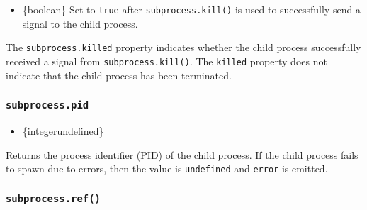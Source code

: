 \begin{itemize}
\tightlist
\item
  \{boolean\} Set to \texttt{true} after \texttt{subprocess.kill()} is
  used to successfully send a signal to the child process.
\end{itemize}

The \texttt{subprocess.killed} property indicates whether the child
process successfully received a signal from \texttt{subprocess.kill()}.
The \texttt{killed} property does not indicate that the child process
has been terminated.

\subsubsection{\texorpdfstring{\texttt{subprocess.pid}}{subprocess.pid}}\label{subprocess.pid}

\begin{itemize}
\tightlist
\item
  \{integer\textbar undefined\}
\end{itemize}

Returns the process identifier (PID) of the child process. If the child
process fails to spawn due to errors, then the value is
\texttt{undefined} and \texttt{error} is emitted.

\begin{Shaded}
\begin{Highlighting}[]
\OperatorTok{=} \NormalTok{(}\NormalTok{)}\OperatorTok{;}
\OperatorTok{=} \NormalTok{(}\OperatorTok{,}\NormalTok{ [}\NormalTok{])}\OperatorTok{;}

\NormalTok{(}\SpecialCharTok{$\{}\SpecialCharTok{\}}\VerbatimStringTok{\textasciigrave{}}\NormalTok{)}\OperatorTok{;}
\NormalTok{()}\OperatorTok{;}
\end{Highlighting}
\end{Shaded}

\subsubsection{\texorpdfstring{\texttt{subprocess.ref()}}{subprocess.ref()}}\label{subprocess.ref}

